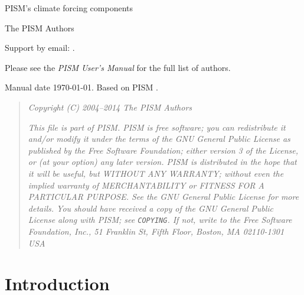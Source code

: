 \documentclass[titlepage,letterpaper,final]{scrartcl}
\begin{document}
\begin{titlepage}

  \begin{center}
    \vspace*{3.5cm}
    {\huge{} PISM's climate forcing components}
    \vspace{0.5cm}

    {\Large The PISM Authors}
    \vspace{1cm}
  \end{center}

\setcounter{tocdepth}{3}
\small
\tableofcontents
\normalsize

\vspace{0.3in}

  \begin{center}
    \small Support by email: \PISMEMAIL.

    \medskip
    Please see the \emph{PISM User's Manual} for the full list of authors.

    \medskip
    Manual date \today.  Based on PISM \PISMREV.

    \medskip
    \PISMDOWNLOADMSG
 \end{center}

\vspace{0.3in}
\begin{quote}
  \textsl{Copyright (C) 2004--2014 The PISM Authors}
  \medskip

  \noindent \textsl{This file is part of PISM.  PISM is free software; you can redistribute it and/or modify it under the terms of the GNU General Public License as published by the Free Software Foundation; either version 3 of the License, or (at your option) any later version.  PISM is distributed in the hope that it will be useful, but WITHOUT ANY WARRANTY; without even the implied warranty of MERCHANTABILITY or FITNESS FOR A PARTICULAR PURPOSE.  See the GNU General Public License for more details.  You should have received a copy of the GNU General Public License along with PISM; see \emph{\texttt{COPYING}}.  If not, write to the Free Software Foundation, Inc., 51 Franklin St, Fifth Floor, Boston, MA  02110-1301 USA}
\end{quote}
\normalsize

\end{titlepage}

\newpage


\section{Introduction}
\label{sec:intro}
\end{document}
